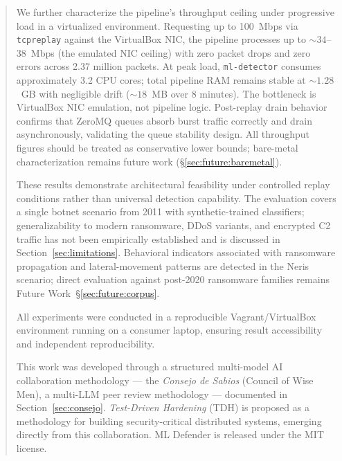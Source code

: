\documentclass[11pt,a4paper]{article}
\begin{document}
\begin{abstract}
        We further characterize the pipeline's throughput ceiling under progressive load in a
        virtualized environment. Requesting up to 100~Mbps via \texttt{tcpreplay} against the
        VirtualBox NIC, the pipeline processes up to ${\sim}34$--38~Mbps (the emulated NIC ceiling)
        with zero packet drops and zero errors across 2.37 million packets. At peak load,
        \texttt{ml-detector} consumes approximately 3.2 CPU cores; total pipeline RAM remains stable
        at ${\sim}1.28$~GB with negligible drift (${\sim}18$~MB over 8 minutes). The bottleneck is
        VirtualBox NIC emulation, not pipeline logic. Post-replay drain behavior confirms that
        ZeroMQ queues absorb burst traffic correctly and drain asynchronously, validating the queue
        stability design. All throughput figures should be treated as conservative lower bounds;
        bare-metal characterization remains future work (\S\ref{sec:future:baremetal}).

        These results demonstrate architectural feasibility under controlled replay conditions rather
        than universal detection capability. The evaluation covers a single botnet scenario from 2011
        with synthetic-trained classifiers; generalizability to modern ransomware, DDoS variants, and
        encrypted C2 traffic has not been empirically established and is discussed in
        Section~\ref{sec:limitations}. Behavioral indicators associated with ransomware propagation
        and lateral-movement patterns are detected in the Neris scenario; direct evaluation against
        post-2020 ransomware families remains Future Work~\S\ref{sec:future:corpus}.

        All experiments were conducted in a reproducible Vagrant/VirtualBox environment running on a
        consumer laptop, ensuring result accessibility and independent reproducibility.

        This work was developed through a structured multi-model AI collaboration methodology ---
        the \emph{Consejo de Sabios} (Council of Wise Men), a multi-LLM peer review methodology ---
        documented in Section~\ref{sec:consejo}. \emph{Test-Driven Hardening} (TDH) is proposed
        as a methodology for building security-critical distributed systems, emerging directly from
        this collaboration. ML Defender is released under the MIT license.
    \end{abstract}

    \tableofcontents
    \newpage

\end{document}
